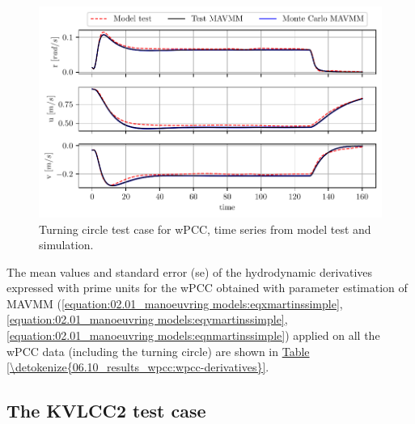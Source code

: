 \begin{figure}[!htb]
\centering
\includegraphics[width=\textwidth]{kappa/images/11.pdf}
\caption{Turning circle test case for wPCC, time series from model test and simulation.}\label{\detokenize{06.10_results_wpcc:fig-testing-sim}}\end{figure}

\clearpage
\noindent The mean values and standard error (se) of the hydrodynamic derivatives expressed with prime units for the wPCC obtained with parameter estimation of MAVMM (\autoref{equation:02.01_manoeuvring models:eqxmartinssimple}, \autoref{equation:02.01_manoeuvring models:eqymartinssimple},  \autoref{equation:02.01_manoeuvring models:eqnmartinssimple}) applied on all the wPCC data (including the turning circle)  are shown in \hyperref[\detokenize{06.10_results_wpcc:wpcc-derivatives}]{Table \ref{\detokenize{06.10_results_wpcc:wpcc-derivatives}}}.



\subsection{The KVLCC2 test case}
\label{\detokenize{05.01_case_studies:the-kvlcc2-test-scenarios}}

